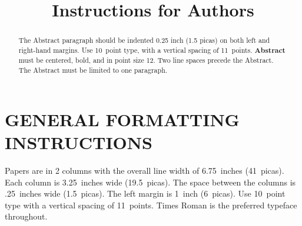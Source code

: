 

\title{Instructions for Authors} 

\author{} %

%
 
 
 
\maketitle 
 
\begin{abstract} 
The Abstract paragraph should be indented 0.25 inch (1.5 picas) on
both left and right-hand margins.  Use 10~point type, with a vertical
spacing of 11~points.  {\bf Abstract} must be centered, bold, and in
point size 12. Two line spaces precede the Abstract. The Abstract must
be limited to one paragraph.
\end{abstract} 
 
\section{GENERAL FORMATTING INSTRUCTIONS} 
 
Papers are in 2 columns with the overall line width of 6.75~inches
(41~picas).  Each column is 3.25~inches wide (19.5~picas).  The space
between the columns is .25~inches wide (1.5~picas).  The left margin
is 1~inch (6~picas).  Use 10~point type with a vertical spacing of
11~points.  Times Roman is the preferred typeface throughout.
 
